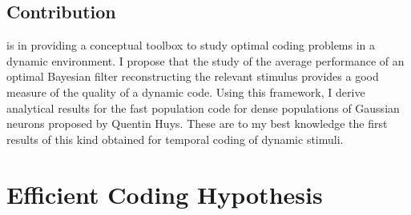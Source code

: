 \subsection*{Contribution}
 is in providing a conceptual toolbox to study optimal coding problems in a dynamic environment. I propose that the study of the average performance of an optimal Bayesian filter reconstructing the relevant stimulus provides a good measure of the quality of a dynamic code. Using this framework, I derive analytical results for the fast population code for dense populations of Gaussian neurons proposed by Quentin Huys\cite{Huys2007}. These are to my best knowledge the first results of this kind obtained for temporal coding of dynamic stimuli.

\section{Efficient Coding Hypothesis}

